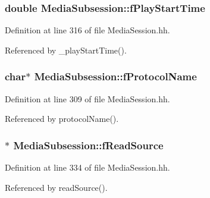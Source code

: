 \subsubsection[{f\+Play\+Start\+Time}]{\setlength{\rightskip}{0pt plus 5cm}double Media\+Subsession\+::f\+Play\+Start\+Time\hspace{0.3cm}{\ttfamily [protected]}}\label{classMediaSubsession_a2a835d3c8f221c2c08e570ef8d4accd3}


Definition at line 316 of file Media\+Session.\+hh.



Referenced by \+\_\+play\+Start\+Time().

\subsubsection[{f\+Protocol\+Name}]{\setlength{\rightskip}{0pt plus 5cm}char$\ast$ Media\+Subsession\+::f\+Protocol\+Name\hspace{0.3cm}{\ttfamily [protected]}}\label{classMediaSubsession_a53e8bbc30503d9f1f7cf30414c91a75a}


Definition at line 309 of file Media\+Session.\+hh.



Referenced by protocol\+Name().

\subsubsection[{f\+Read\+Source}]{$\ast$ Media\+Subsession\+::f\+Read\+Source\hspace{0.3cm}{\ttfamily [protected]}}\label{classMediaSubsession_a36f04b7ef412953bd677716faf7fb10a}


Definition at line 334 of file Media\+Session.\+hh.



Referenced by read\+Source().

